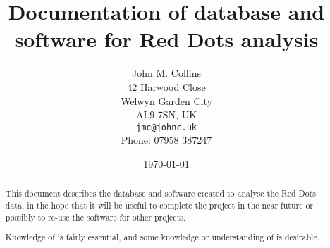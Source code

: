 \title{Documentation of database and software for Red Dots analysis}

\author{John M. Collins\\
  42 Harwood Close\\
  Welwyn Garden City\\
  AL9 7SN, UK\\
  \texttt{jmc@johnc.uk}\\
  Phone: 07958 387247\\
  }
\engwithth
\date{\today}
\maketitle

\begin{abstract}

  This document describes the database and software created to analyse the Red
  Dots data, in the hope that it will be useful to complete the project in the
  near future or possibly to re-use the software for other projects.
  
  Knowledge of {\py} is fairly essential, and some knowledge or understanding
  of {\mysql} is desirable.
  
\end{abstract}
